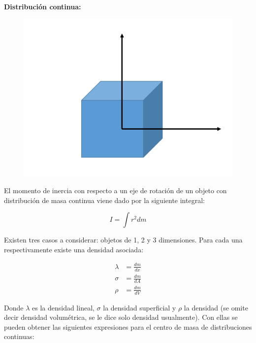 \documentclass[a4paper,11pt]{article}
\begin{document}
\vspace{1cm}







\textbf{Distribución continua:}


\begin{figure}
	\includegraphics[scale=0.5]{./im/3d}
\end{figure}
El momento de inercia con respecto a un eje de rotación de un objeto con distribución de masa continua viene dado por la siguiente integral:

\begin{equation}
 I=  \int r^2 dm
\end{equation}

Existen tres casos a considerar: objetos de 1, 2 y 3 dimensiones. Para cada una respectivamente existe una densidad asociada:

\begin{subequations}
	\begin{align}
	\lambda &= \frac{d m}{dx} \\
	\sigma &= \frac{d m}{dA} \\
	\rho &= \frac{d m}{dV} 
	\end{align}
\end{subequations}

Donde $\lambda$ es la densidad lineal, $\sigma$ la densidad superficial y $\rho$ la densidad (se omite decir densidad volumétrica, se le dice solo densidad usualmente). Con ellas se pueden obtener las siguientes expresiones para el centro de masa de distribuciones continuas:
\end{document}
